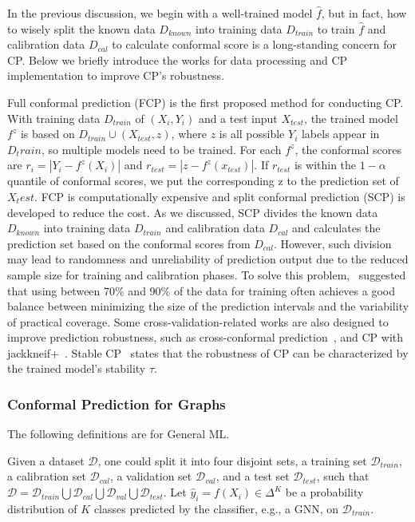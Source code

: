 In the previous discussion, we begin with a well-trained model $\hat{f}$, but in fact, how to wisely split the known data $D_{known}$ into training data $D_{train}$ to train $\hat{f}$ and calibration data $D_{cal}$ to calculate conformal score is a long-standing concern for CP. Below we briefly introduce the works for data processing and CP implementation to improve CP's robustness. 

Full conformal prediction (FCP) is the first proposed method for conducting CP. With training data $D_{train}$ of $(X_i,Y_i)$ and a test input $X_{test}$, the trained model $f^z$ is based on $D_{train}\cup (X_{test},z) $, where $z$ is all possible $Y_i$ labels appear in $D_train$, so multiple models need to be trained. For each $f^z$, the conformal scores are $r_i=|Y_i-f^z(X_i)|$ and $r_{test}=|z-f^z(x_{test})|$. If $r_{test}$ is within the $1-\alpha$ quantile of conformal scores, we put the corresponding z to the prediction set of $X_test$. FCP is computationally expensive and split conformal prediction (SCP) is developed to reduce the cost. As we discussed, SCP divides the known data $D_{known}$ into training data $D_{train}$ and calibration data $D_{cal}$ and calculates the prediction set based on the conformal scores from $D_{cal}$. However, such division may lead to randomness and unreliability of prediction output due to the reduced sample size for training and calibration phases. To solve this problem,~\cite{Sesia2019ACO} suggested that using between 70$\%$ and 90$\%$ of the data for training often achieves a good balance between minimizing the size of the prediction intervals and the variability of practical coverage. Some cross-validation-related works are also designed to improve prediction robustness, such as cross-conformal prediction~\cite{Vovk2012CrossconformalP}, and CP with jackkneif+~\cite{Barber2019PredictiveIW}. Stable CP~\cite{ndiaye2022stable} states that the robustness of CP can be characterized by the trained model's stability $\tau$. 
\subsubsection{Conformal Prediction for Graphs}
The following definitions are for General ML.

Given a dataset $\mathcal{D}$, one could split it into four disjoint sets, a training set $\mathcal{D}_{train}$, a calibration set $\mathcal{D}_{cal}$, a validation set $\mathcal{D}_{val}$, and a test set $\mathcal{D}_{test}$, such that $\mathcal{D} = \mathcal{D}_{train} \bigcup \mathcal{D}_{cal} \bigcup \mathcal{D}_{val} \bigcup \mathcal{D}_{test}$.
Let $\hat{y}_i= f(X_i) \in \Delta^K$ be a probability distribution of $K$ classes predicted by the classifier, e.g., a GNN, on $\mathcal{D}_{train}$.
% 

